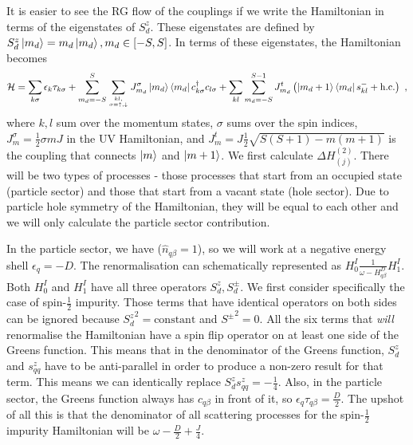 \documentclass[reprint,onecolumn,prb,superscriptaddress]{revtex4-2}
\begin{document}
It is easier to see the RG flow of the couplings if we write the Hamiltonian in terms of the eigenstates of \(S_d^z\). These eigenstates are defined by \(S_d^z\ket{m_d} = m_d\ket{m_d}, m_d \in \left[-S, S\right]\). In terms of these eigenstates, the Hamiltonian becomes
\begin{equation}\begin{aligned}
	\label{H_spin_S}
	\mathcal{H} = \sum_{k\sigma}\epsilon_{k}\tau_{k\sigma} + \sum_{m_d=-S}^S \sum_{kl,\atop{\sigma=\uparrow,\downarrow}} J^\sigma_{m_d} \ket{m_d}\bra{m_d} c^\dagger_{k \sigma}c_{l \sigma} + \sum_{kl} \sum_{m_d=-S}^{S-1} J^t_{m_d} \left(\ket{m_d+1}\bra{m_d} s^-_{kl}  + \text{h.c.}\right)~,
\end{aligned}\end{equation}
where \(k,l\) sum over the momentum states, \(\sigma\) sums over the spin indices, \(J^\sigma_m = \frac{1}{2} \sigma m J\) in the UV Hamiltonian, and \(J^t_{m} = J\frac{1}{2}\sqrt{S(S+1) - m(m+1)}\) is the coupling that connects \(\ket{m}\) and \(\ket{m+1}\). We first calculate \(\Delta H^{(2)}_{(j)}\). There will be two types of processes - those processes that start from an occupied state (particle sector) and those that start from a vacant state (hole sector). Due to particle hole symmetry of the Hamiltonian, they will be equal to each other and we will only calculate the particle sector contribution. 

In the particle sector, we have (\(\hat n_{q\beta}=1\)), so we will work at a negative energy  shell \(\epsilon_q = -D\). The renormalisation can schematically represented as \(H^I_0 \frac{1}{\omega - H^D_{q\beta}} H^I_1\). Both \(H^I_0\) and \(H^I_1\) have all three operators \(S_d^z, S_d^\pm\). We first consider specifically the case of spin-\(\frac{1}{2}\) impurity. Those terms that have identical operators on both sides can be ignored because \({S_d^z}^2 = \text{constant}\) and \({S^\pm}^2 = 0\). All the six terms that \textit{will} renormalise the Hamiltonian have a spin flip operator on at least one side of the Greens function. This means that in the denominator of the Greens function, \(S_d^z\) and \(s^z_{qq}\) have to be anti-parallel in order to produce a non-zero result for that term. This means we can identically replace \(S_d^z s^z_{qq} = -\frac{1}{4}\). Also, in the particle sector, the Greens function always has \(c_{q\beta}\) in front of it, so \(\epsilon_q \tau_{q\beta} = \frac{D}{2}\). The upshot of all this is that the denominator of all scattering processes for the spin-\(\frac{1}{2}\) impurity Hamiltonian will be \(\omega - \frac{D}{2} + \frac{J}{4}\).
\end{document}
